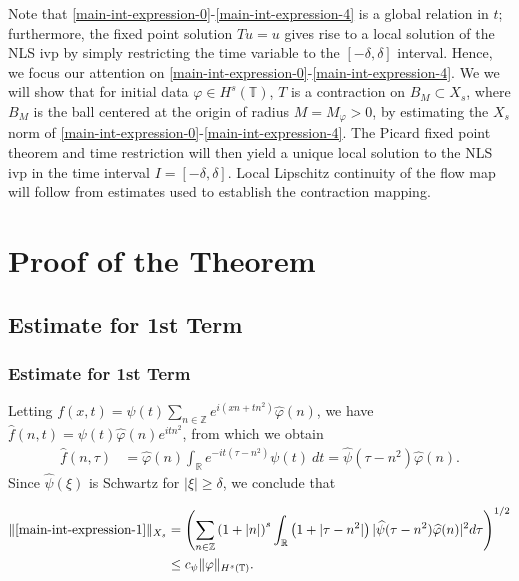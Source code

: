 \documentclass[handout]{beamer}
\numberwithin{equation}{section}
\newcommand{\rr}{\mathbb{R}}
\newcommand{\zz}{\mathbb{Z}}
\newcommand{\ci}{\mathbb{T}}
\newcommand{\wh}{\widehat}
\newcommand{\vp}{\varphi}
\begin{document}
\begin{frame}

Note that 
\eqref{main-int-expression-0}-\eqref{main-int-expression-4} is a global 
relation in $t$; furthermore, the fixed point solution $Tu=u$ gives rise to a 
local solution of the NLS ivp by simply restricting the time 
variable to 
the $[-\delta, \delta]$ interval. Hence, we focus our attention on 
\eqref{main-int-expression-0}-\eqref{main-int-expression-4}. We we will 
show that for initial data $\vp \in H^s(\ci)$, $T$ is a contraction on $B_M 
\subset X_s$, where $B_M$ is the ball centered at the origin of radius $M = 
M_{\vp}> 0$, by estimating the $X_s$
norm of \eqref{main-int-expression-0}-\eqref{main-int-expression-4}. The 
Picard fixed point theorem and time restriction will
then yield a unique local solution to the NLS ivp in the time interval
$I = [-\delta, \delta]$. Local Lipschitz continuity of the flow map will follow
from estimates used to establish the contraction mapping.
%
%
%
\end{frame}

\section{Proof of the Theorem}
%
%
%
%
%
%
%
%
%
%
\subsection{Estimate for 1st Term}
\begin{frame}
	\frametitle{Estimate for 1st Term}
%
%
Letting $f(x,t) = \psi(t) \sum_{n \in \zz} e^{i(xn + tn^{2})} 
\wh{\vp}(n)$, we have $\wh{f}(n,t) = \psi(t) \wh{\vp}(n) e^{itn^{2}}$,
from which we obtain
%
%
\begin{equation}
	\label{fourier-trans-calc}
	\begin{split}
		\wh{f}(n, \tau)
		& = \wh{\vp}(n) \int_\rr e^{-it( \tau - n^{2})} 
		\psi(t) \ d t
		= \wh{\psi}(\tau - n^{2}) \wh{\vp}(n).
	\end{split}
\end{equation}
%
%
%
%
%
%
Since $\wh{\psi}(\xi)$ is Schwartz for $|\xi| \ge \delta$, we conclude that 

\end{frame}
%
%
%
\begin{frame}

\begin{equation}
	\begin{split}
	\label{main-int1-est}
		\|\eqref{main-int-expression-1}\|_{X_s}
		& = \left(  \sum_{n\in \zz} \left(1 + |n| \right)^s \int_\rr \left( 1 + | \tau - n^{2} | \right)
		| \wh{\psi}(\tau - n^{2}) \wh{\vp}(n) |^2 d \tau \right)^{1/2} 
		\\
		& \le
		c_\psi \|\vp\|_{H^s(\ci)}.
	\end{split}
\end{equation}
%
%
\end{frame}
\end{document}
